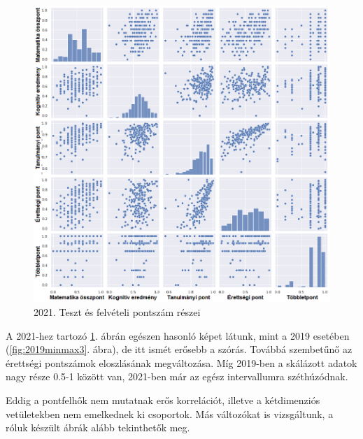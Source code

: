 \documentclass[12pt]{article}
\begin{document}
\begin{figure}[H]
\centering
\includegraphics[width=\textwidth]{kepek/2021minmax3.png}
\caption{2021. Teszt és felvételi pontszám részei}
\label{fig:2021minmax3}
\end{figure}

A 2021-hez tartozó \ref{fig:2021minmax3}. ábrán egészen hasonló képet látunk, mint a 2019 esetében (\ref{fig:2019minmax3}. ábra), de itt ismét erősebb a szórás. Továbbá szembetűnő az érettségi pontszámok eloszlásának megváltozása. Míg 2019-ben a skálázott adatok nagy része 0.5-1 között van, 2021-ben már az egész intervallumra széthúzódnak. 

Eddig a pontfelhők nem mutatnak erős korrelációt, illetve a kétdimenziós vetületekben nem emelkednek ki csoportok. Más változókat is vizsgáltunk, a róluk készült ábrák alább tekinthetők meg.
\end{document}
